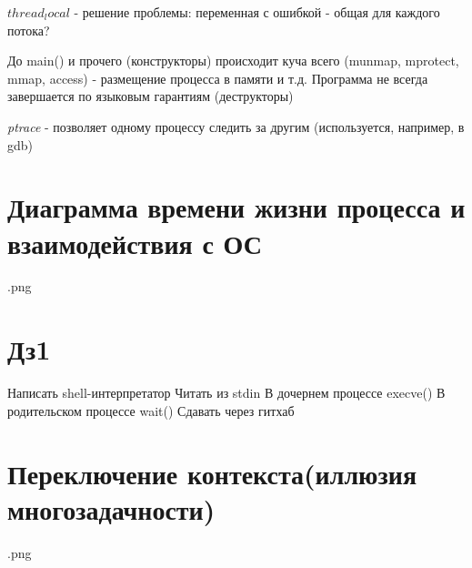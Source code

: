 \documentclass[../lectures.tex]{subfiles}
\begin{document}
$thread_local$ - решение проблемы: переменная с ошибкой - общая для каждого потока?

До main() и прочего (конструкторы) происходит куча всего (munmap, mprotect, mmap, access) - размещение процесса в памяти и т.д.
Программа не всегда завершается по языковым гарантиям (деструкторы)

\emph{ptrace} - позволяет одному процессу следить за другим (используется, например, в gdb)

\section{Диаграмма времени жизни процесса и взаимодействия с ОС}
.png

\section{Дз1} 
Написать shell-интерпретатор
Читать из stdin 
В дочернем процессе execve()
В родительском процессе wait()
Сдавать через гитхаб

\section{Переключение контекста(иллюзия многозадачности)}
.png
\end{document}
